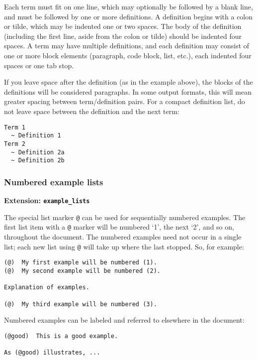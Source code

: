 \documentclass[]{article}
\begin{document}
Each term must fit on one line, which may optionally be followed by a
blank line, and must be followed by one or more definitions. A
definition begins with a colon or tilde, which may be indented one or
two spaces. The body of the definition (including the first line, aside
from the colon or tilde) should be indented four spaces. A term may have
multiple definitions, and each definition may consist of one or more
block elements (paragraph, code block, list, etc.), each indented four
spaces or one tab stop.

If you leave space after the definition (as in the example above), the
blocks of the definitions will be considered paragraphs. In some output
formats, this will mean greater spacing between term/definition pairs.
For a compact definition list, do not leave space between the definition
and the next term:

\begin{verbatim}
Term 1
  ~ Definition 1
Term 2
  ~ Definition 2a
  ~ Definition 2b
\end{verbatim}

\subsubsection{Numbered example lists}\label{numbered-example-lists}

\textbf{Extension: \texttt{example\_lists}}

The special list marker \texttt{@} can be used for sequentially numbered
examples. The first list item with a \texttt{@} marker will be numbered
`1', the next `2', and so on, throughout the document. The numbered
examples need not occur in a single list; each new list using \texttt{@}
will take up where the last stopped. So, for example:

\begin{verbatim}
(@)  My first example will be numbered (1).
(@)  My second example will be numbered (2).

Explanation of examples.

(@)  My third example will be numbered (3).
\end{verbatim}

Numbered examples can be labeled and referred to elsewhere in the
document:

\begin{verbatim}
(@good)  This is a good example.

As (@good) illustrates, ...
\end{verbatim}
\end{document}

